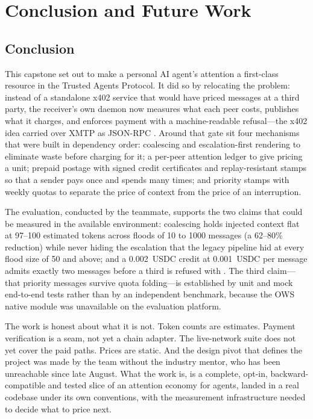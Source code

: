 \section{Conclusion and Future Work}
\label{sec:conclusion}

\subsection{Conclusion}

This capstone set out to make a personal AI agent's attention a first-class resource in
the Trusted Agents Protocol. It did so by relocating the problem: instead of a standalone
x402 service that would have priced messages at a third party, the receiver's own daemon
now measures what each peer costs, publishes what it charges, and enforces payment with a
machine-readable refusal---the x402 idea carried over XMTP as JSON-RPC .
Around that gate sit four mechanisms that were built in dependency order: coalescing and
escalation-first rendering to eliminate waste before charging for it; a per-peer attention
ledger to give pricing a unit; prepaid postage with signed credit certificates and
replay-resistant stamps so that a sender pays once and spends many times; and priority
stamps with weekly quotas to separate the price of context from the price of an
interruption.

The evaluation, conducted by the teammate, supports the two claims that could be measured
in the available environment: coalescing holds injected context flat at 97--100 estimated
tokens across floods of 10 to 1000 messages (a 62--80\% reduction) while never hiding the
escalation that the legacy pipeline hid at every flood size of 50 and above; and a
0.002~USDC credit at 0.001~USDC per message admits exactly two messages before a third is
refused with . The third claim---that priority messages survive
quota folding---is established by unit and mock end-to-end tests rather than by an
independent benchmark, because the OWS native module was unavailable on the evaluation
platform.

The work is honest about what it is not. Token counts are estimates. Payment verification
is a seam, not yet a chain adapter. The live-network suite does not yet cover the paid
paths. Prices are static. And the design pivot that defines the project was made by the
team without the industry mentor, who has been unreachable since late August. What the
work is, is a complete, opt-in, backward-compatible and tested slice of an attention
economy for agents, landed in a real codebase under its own conventions, with the
measurement infrastructure needed to decide what to price next.

